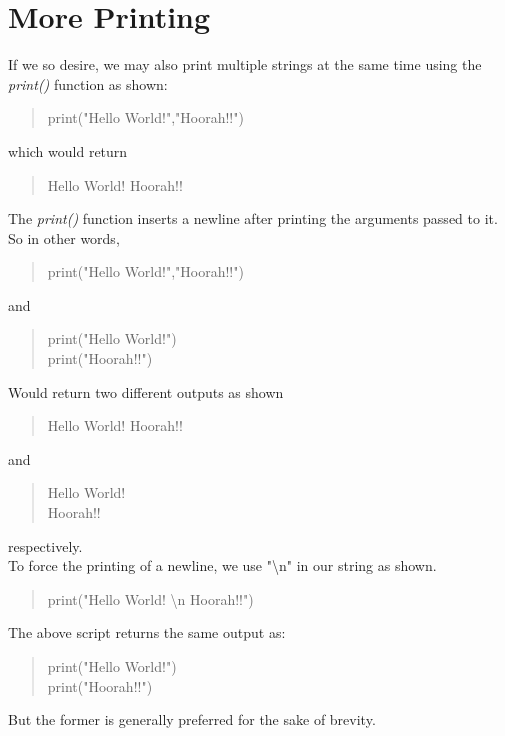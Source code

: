 \section{More Printing}
If we so desire, we may also print multiple strings at the same time using the \emph{print()} function as shown:
\begin{quote}
print("Hello World!","Hoorah!!")
\end{quote}
which would return
\begin{quote}
Hello World! Hoorah!!
\end{quote}
The \emph{print()} function inserts a newline after printing the arguments passed to it. So in other words,
\begin{quote}
print("Hello World!","Hoorah!!")
\end{quote}
and 
\begin{quote}
print("Hello World!")\\
print("Hoorah!!")
\end{quote}
Would return two different outputs as shown
\begin{quote}
Hello World! Hoorah!!
\end{quote}
and 
\begin{quote}
Hello World!\\
Hoorah!!
\end{quote}
respectively.\\
To force the printing of a newline, we use "\textbackslash n" in our string as shown.
\begin{quote}
print("Hello World! \textbackslash n Hoorah!!")
\end{quote}
The above script returns the same output as:
\begin{quote}
print("Hello World!")\\
print("Hoorah!!")
\end{quote}
But the former is generally preferred for the sake of brevity.
